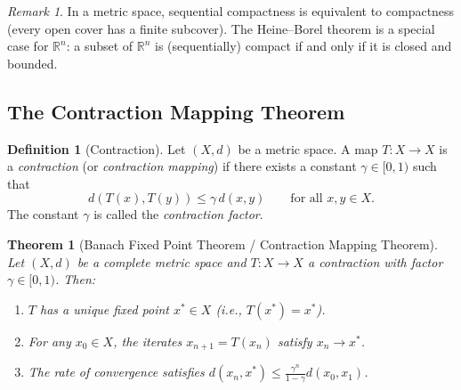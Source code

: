 \documentclass[11pt,a4paper]{article}
\theoremstyle{definition}
\newtheorem{definition}{Definition}[section]
\theoremstyle{plain}
\newtheorem{theorem}{Theorem}[section]
\theoremstyle{remark}
\newtheorem{remark}{Remark}[section]
\newcommand{\R}{\mathbb{R}}
\begin{document}
\begin{remark}
\label{rem:compact_equiv}
In a metric space, sequential compactness is equivalent to compactness (every open
cover has a finite subcover). The Heine--Borel theorem is a special case for $\R^n$:
a subset of $\R^n$ is (sequentially) compact if and only if it is closed and bounded.
\end{remark}

\subsection{The Contraction Mapping Theorem}
\label{subsec:contraction}

\begin{definition}[Contraction]
\label{def:contraction}
Let $(X, d)$ be a metric space. A map $T : X \to X$ is a \emph{contraction}
(or \emph{contraction mapping}) if there exists a constant $\gamma \in [0, 1)$
such that
\[
d(T(x), T(y)) \le \gamma \, d(x, y) \qquad \text{for all } x, y \in X.
\]
The constant $\gamma$ is called the \emph{contraction factor}.
\end{definition}

\begin{theorem}[Banach Fixed Point Theorem / Contraction Mapping Theorem]
\label{thm:banach_fixed_point}
Let $(X, d)$ be a complete metric space and $T : X \to X$ a contraction with
factor $\gamma \in [0, 1)$. Then:
\begin{enumerate}[nosep,label=(\roman*)]
    \item $T$ has a unique fixed point $x^* \in X$ (i.e., $T(x^*) = x^*$).
    \item For any $x_0 \in X$, the iterates $x_{n+1} = T(x_n)$ satisfy
    $x_n \to x^*$.
    \item The rate of convergence satisfies
    $d(x_n, x^*) \le \frac{\gamma^n}{1 - \gamma} d(x_0, x_1)$.
\end{enumerate}
\end{theorem}
\end{document}
